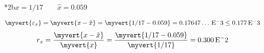 \documentclass["CNA-Notebook.tex"]{subfiles}
\begin{document}
\begin{sectionBox}
  \begin{exampleBox}*2b{\( 
      x=1/17 \qquad \hat{x}=0.059
  \) } %
    \answer{}

    \begin{gather*}
      \myvert{\varepsilon_x}
      = \myvert{x-\hat{x}}
      = \myvert{1/17-0.059}
      = 0.17647\dots\E-3
      \leq 0.177\E-3
    \end{gather*}
    \begin{gather*}
      r_x
      = \frac{\myvert{x-\hat{x}}}{\myvert{x}}
      = \frac{\myvert{1/17-0.059}}{\myvert{1/17}}
      = 0.300\E-2
    \end{gather*}
  \end{exampleBox}

\end{sectionBox}
\end{document}
